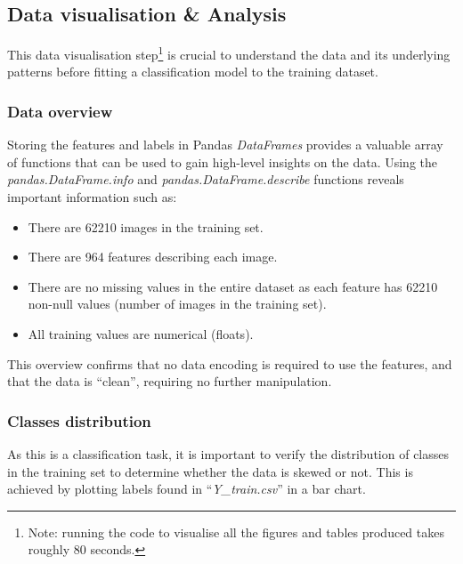 \documentclass[letterpaper,12pt]{article}
\begin{document}
\subsection{Data visualisation \& Analysis}

This data visualisation step\footnote{Note: running the code to visualise all the figures and tables produced takes roughly 80 seconds.} is crucial to understand the data and its underlying patterns before fitting a classification model to the training dataset.

\subsubsection{Data overview}

Storing the features and labels in Pandas \textit{DataFrames} provides a valuable array of functions that can be used to gain high-level insights on the data. Using the \textit{pandas.DataFrame.info} and \textit{pandas.DataFrame.describe} functions reveals important information such as:
\begin{itemize}
    \item There are 62210 images in the training set.
    \item There are 964 features describing each image.
    \item There are no missing values in the entire dataset as each feature has 62210 non-null values (number of images in the training set).
    \item All training values are numerical (floats).
\end{itemize}

This overview confirms that no data encoding is required to use the features, and that the data is ``clean'', requiring no further manipulation.

\subsubsection{Classes distribution}

As this is a classification task, it is important to verify the distribution of classes in the training  set to determine whether the data is skewed or not. This is achieved by plotting labels found in ``\textit{Y\_train.csv}'' in a bar chart.
\end{document}
